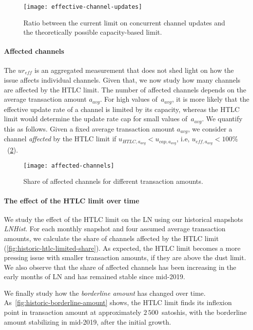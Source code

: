 \begin{figure}[tb]
	\centering
	\texttt{[image: effective-channel-updates]}
	\caption{Ratio between the current limit on concurrent channel updates and the theoretically possible capacity-based limit.}
	\label{fig:effective-channel-updates}
\end{figure}

\paragraph{Affected channels}
The $ur_\textit{eff}$ is an aggregated measurement that does not shed light on how the issue affects individual channels. 
Given that, we now study how many channels are affected by the HTLC limit.
The number of affected channels depends on the average transaction amount $a_\textit{avg}$.
For high values of~$a_\textit{avg}$, it is more likely that the effective update rate of a channel is limited by its capacity, whereas the HTLC limit would determine the update rate cap for small values of~$a_\textit{avg}$.
We quantify this as follows.
Given a fixed average transaction amount $a_\textit{avg}$, we consider a channel \textit{affected} by the HTLC limit if $u_{\textit{HTLC},a_\textit{avg}} < u_{\textit{cap},a_\textit{avg}}$, i.e, $u_{\textit{eff},a_\textit{avg}} < 100\%$~(\cref{fig:affected-channels}).

\begin{figure}[tb]
	\centering
	\texttt{[image: affected-channels]}
	\caption{Share of affected channels for different transaction amounts.}
	\label{fig:affected-channels}
\end{figure}


\paragraph{The effect of the HTLC limit over time}

We study the effect of the HTLC limit on the LN using our historical snapshots \emph{LNHist}.
For each monthly snapshot and four assumed average transaction amounts, we calculate the share of channels affected by the HTLC limit (\cref{fig:historic-htlc-limited-share}).
As expected, the HTLC limit becomes a more pressing issue with smaller transaction amounts, if they are above the dust limit.
We also observe that the share of affected channels has been increasing in the early months of LN and has remained stable since mid-2019.

We finally study how the \textit{borderline amount} has changed over time.
As~\cref{fig:historic-borderline-amount} shows, the HTLC limit finds its inflexion point in transaction amount at approximately $2\,500$~satoshis, with the borderline amount stabilizing in mid-2019, after the initial growth.

